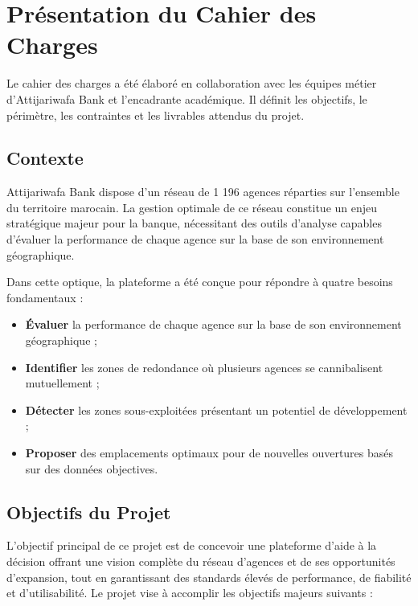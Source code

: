 \documentclass[11pt,a4paper,twoside]{report}
\begin{document}
\section{Présentation du Cahier des Charges}

Le cahier des charges a été élaboré en collaboration avec les équipes métier d'Attijariwafa Bank et l'encadrante académique. Il définit les objectifs, le périmètre, les contraintes et les livrables attendus du projet.

\subsection{Contexte}

Attijariwafa Bank dispose d'un réseau de 1 196 agences réparties sur l'ensemble du territoire marocain. La gestion optimale de ce réseau constitue un enjeu stratégique majeur pour la banque, nécessitant des outils d'analyse capables d'évaluer la performance de chaque agence sur la base de son environnement géographique.

Dans cette optique, la plateforme a été conçue pour répondre à quatre besoins fondamentaux :

\begin{itemize}[leftmargin=1.2cm]
    \item \textbf{Évaluer} la performance de chaque agence sur la base de son environnement géographique ;
    \item \textbf{Identifier} les zones de redondance où plusieurs agences se cannibalisent mutuellement ;
    \item \textbf{Détecter} les zones sous-exploitées présentant un potentiel de développement ;
    \item \textbf{Proposer} des emplacements optimaux pour de nouvelles ouvertures basés sur des données objectives.
\end{itemize}

\subsection{Objectifs du Projet}

L'objectif principal de ce projet est de concevoir une plateforme d'aide à la décision offrant une vision complète du réseau d'agences et de ses opportunités d'expansion, tout en garantissant des standards élevés de performance, de fiabilité et d'utilisabilité. Le projet vise à accomplir les objectifs majeurs suivants :
\end{document}
